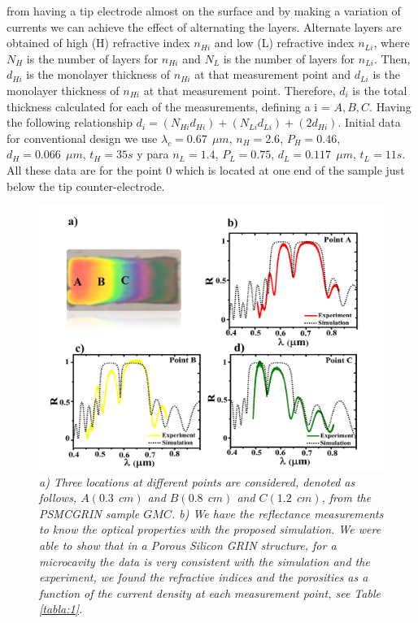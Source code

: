 \documentclass{article}
\begin{document}
from having a tip electrode almost on the surface and by making a
variation of currents we can achieve the effect of alternating the
layers. Alternate layers are obtained of high (H) refractive index
$n_{Hi}$ and low (L) refractive index $n_{Li}$, where $N_{H}$
is the number of layers for  $n_{Hi}$ and $N_L$ is the number
of layers for $n_{Li}$. Then,  $d_{Hi}$ is the monolayer
thickness of  $n_{Hi}$ at that measurement point and $d_{Li}$ is
the monolayer thickness of $n_{Hi}$ at that measurement
point. Therefore,  $d_i$ is the total thickness calculated for
each of the measurements, defining a i = $ A, B, C$. Having the
following relationship $d_i =
(N_{Hi}d_{Hi})+(N_{Li}d_{Li}) + (2d_{Hi})$.
Initial data for conventional design we use  $\lambda_c= 0.67 \ \
\mu m$, $n_H =2.6$, $P_H =0.46$, $d_H=0.066 \ \ \mu m
$, $t_H=35 s  $ y para  $n_L= 1.4$,  $P_L =0.75$,
$d_L=0.117 \ \ \mu m  $, $t_L=11 s  $. All these data are
for the point $ 0 $ which is located at one end of the sample just
below the tip counter-electrode.
\begin{figure}
  \centering
  \includegraphics[scale=.5]{Images/MCGRIN2}
  \caption{\emph{a) Three locations at different points are
      considered, denoted as follows, $ A (0.3 \ \ cm) $ and $ B
      (0.8 \ \ cm) $ and $ C (1.2 \ \ cm) $, from the PSMCGRIN
      sample $ GMC $. b) We have the reflectance measurements to
      know the optical properties with the proposed
      simulation. We were able to show that in a Porous Silicon
      GRIN structure, for a microcavity the data is very
      consistent with the simulation and the experiment, we
      found the refractive indices and the porosities as a
      function of the current density at each measurement point,
      see Table \ref{tabla:1}. }}
  \label{fig:MCGRIN3}
\end{figure}
\end{document}
